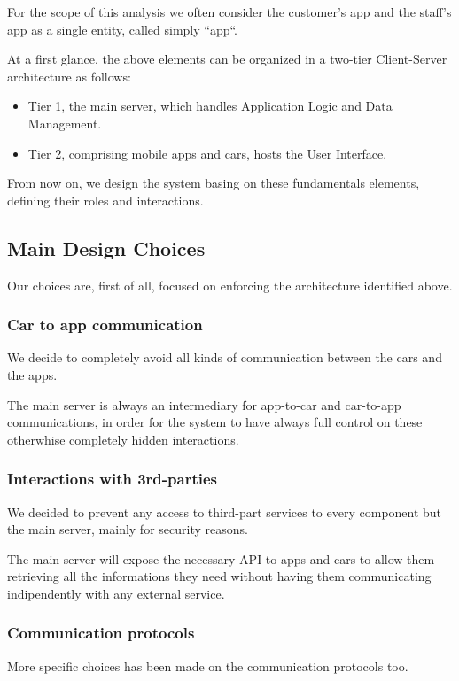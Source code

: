 \documentclass[11pt]{article} %
\begin{document}
\begin{description}
For the scope of this analysis we often consider the customer's app and the staff's app as a single entity, called simply ``app``.

At a first glance, the above elements can be organized in a two-tier Client-Server architecture as follows:
\begin{itemize}[noitemsep]
	\item Tier 1, the main server, which handles Application Logic and Data Management.
	\item Tier 2, comprising mobile apps and cars, hosts the User Interface.
\end{itemize}
From now on, we design the system basing on these fundamentals elements, defining their roles and interactions.




\subsection{Main Design Choices}

Our choices are, first of all, focused on enforcing the architecture identified above. 

\subsubsection{Car to app communication}
We decide to completely avoid all kinds of communication between the cars and the apps. 

 The main server is always an intermediary for app-to-car and car-to-app communications, in order for the system to have always full control on these otherwhise completely hidden interactions.

\subsubsection{Interactions with 3rd-parties}
We decided to prevent any access to third-part services to every component but the main server, mainly for security reasons.

The main server will expose the necessary API to apps and cars to allow them retrieving all the informations they need without having them communicating indipendently with any external service.

\subsubsection{Communication protocols}
More specific choices has been made on the communication protocols too.


\end{description}
\end{document}
